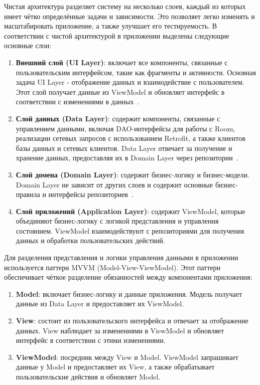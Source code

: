 \documentclass{vsureport}
\begin{document}
Чистая архитектура разделяет систему на несколько слоев, каждый из которых имеет чётко определённые задачи и зависимости. Это позволяет легко изменять и масштабировать приложение, а также улучшает его тестируемость. В соответствии с чистой архитектурой в приложении выделены следующие основные слои:

\begin{enumerate}
    \item \textbf{Внешний слой (UI Layer)}: включает все компоненты, связанные с пользовательским интерфейсом, такие как фрагменты и активности. Основная задача UI Layer - отображение данных и взаимодействие с пользователем. Этот слой получает данные из ViewModel и обновляет интерфейс в соответствии с изменениями в данных~\cite{ref3}.
    \item \textbf{Слой данных (Data Layer)}: содержит компоненты, связанные с управлением данными, включая DAO-интерфейсы для работы с Room, реализации сетевых запросов с использованием Retrofit, а также клиентов базы данных и сетевых клиентов. Data Layer отвечает за получение и хранение данных, предоставляя их в Domain Layer через репозитории~\cite{ref3}.
    \item \textbf{Слой домена (Domain Layer)}: содержит бизнес-логику и бизнес-модели. Domain Layer не зависит от других слоев и содержит основные бизнес-правила и интерфейсы репозиториев~\cite{ref3}.
    \item \textbf{Слой приложений (Application Layer)}: содержит ViewModel, которые объединяют бизнес-логику с логикой представления и управления состоянием. ViewModel взаимодействуют с репозиториями для получения данных и обработки пользовательских действий.
\end{enumerate}

Для разделения представления и логики управления данными в приложении используется паттерн MVVM (Model-View-ViewModel). Этот паттерн обеспечивает чёткое разделение обязанностей между компонентами приложения:

\begin{enumerate}
    \item \textbf{Model}: включает бизнес-логику и данные приложения. Модель получает данные из Data Layer и предоставляет их ViewModel.
    \item \textbf{View}: состоит из пользовательского интерфейса и отвечает за отображение данных. View наблюдает за изменениями в ViewModel и обновляет интерфейс в соответствии с этими изменениями.
    \item \textbf{ViewModel}: посредник между View и Model. ViewModel запрашивает данные у Model и предоставляет их View, а также обрабатывает пользовательские действия и обновляет Model.
\end{enumerate}
\end{document}

